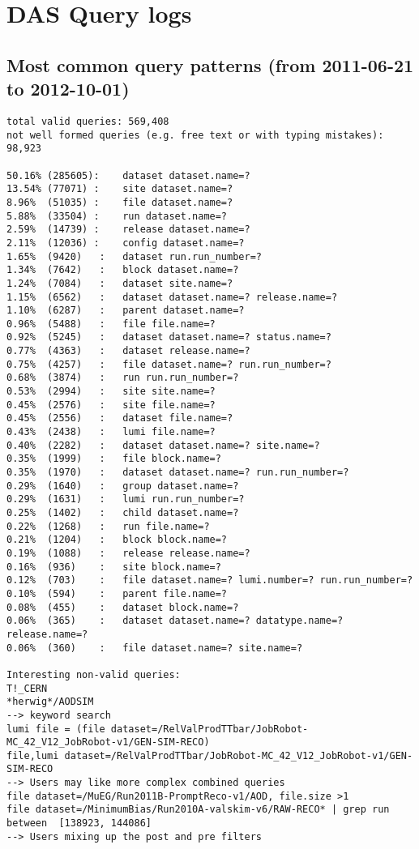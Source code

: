 \appendix
\section{DAS Query logs}

\subsection*{Most common query patterns (from 2011-06-21 to 2012-10-01)}
\begin{verbatim}
total valid queries: 569,408
not well formed queries (e.g. free text or with typing mistakes): 98,923

50.16% (285605):	dataset dataset.name=?
13.54% (77071) :	site dataset.name=?
8.96%  (51035) :	file dataset.name=?
5.88%  (33504) :	run dataset.name=?
2.59%  (14739) :	release dataset.name=?
2.11%  (12036) :	config dataset.name=?
1.65%  (9420) 	:	dataset run.run_number=?
1.34%  (7642) 	:	block dataset.name=?
1.24%  (7084) 	:	dataset site.name=?
1.15%  (6562) 	:	dataset dataset.name=? release.name=?
1.10%  (6287) 	:	parent dataset.name=?
0.96%  (5488) 	:	file file.name=?
0.92%  (5245) 	:	dataset dataset.name=? status.name=?
0.77%  (4363) 	:	dataset release.name=?
0.75%  (4257) 	:	file dataset.name=? run.run_number=?
0.68%  (3874) 	:	run run.run_number=?
0.53%  (2994) 	:	site site.name=?
0.45%  (2576) 	:	site file.name=?
0.45%  (2556) 	:	dataset file.name=?
0.43%  (2438) 	:	lumi file.name=?
0.40%  (2282) 	:	dataset dataset.name=? site.name=?
0.35%  (1999) 	:	file block.name=?
0.35%  (1970) 	:	dataset dataset.name=? run.run_number=?
0.29%  (1640) 	:	group dataset.name=?
0.29%  (1631) 	:	lumi run.run_number=?
0.25%  (1402) 	:	child dataset.name=?
0.22%  (1268) 	:	run file.name=?
0.21%  (1204) 	:	block block.name=?
0.19%  (1088) 	:	release release.name=?
0.16%  (936) 	:	site block.name=?
0.12%  (703) 	:	file dataset.name=? lumi.number=? run.run_number=?
0.10%  (594) 	:	parent file.name=?
0.08%  (455) 	:	dataset block.name=?
0.06%  (365) 	:	dataset dataset.name=? datatype.name=? release.name=?
0.06%  (360) 	:	file dataset.name=? site.name=?

Interesting non-valid queries:
T!_CERN
*herwig*/AODSIM
--> keyword search
lumi file = (file dataset=/RelValProdTTbar/JobRobot-MC_42_V12_JobRobot-v1/GEN-SIM-RECO)
file,lumi dataset=/RelValProdTTbar/JobRobot-MC_42_V12_JobRobot-v1/GEN-SIM-RECO
--> Users may like more complex combined queries
file dataset=/MuEG/Run2011B-PromptReco-v1/AOD, file.size >1
file dataset=/MinimumBias/Run2010A-valskim-v6/RAW-RECO* | grep run between  [138923, 144086] 
--> Users mixing up the post and pre filters
\end{verbatim}
% 
%

